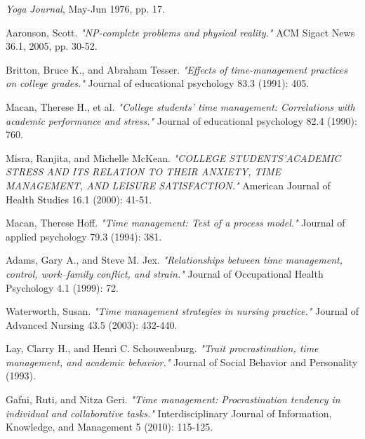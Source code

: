 \documentclass[conference]{IEEEtran}
\begin{document}
\begin{thebibliography}{1}

\emph{Yoga Journal}, \relax May-Jun 1976, pp. 17.

Aaronson, Scott. \emph{"NP-complete problems and physical reality."} ACM Sigact News 36.1, 2005, pp. 30-52.

Britton, Bruce K., and Abraham Tesser. \emph{"Effects of time-management practices on college grades."} Journal of educational psychology 83.3 (1991): 405.

Macan, Therese H., et al. \emph{"College students' time management: Correlations with academic performance and stress."} Journal of educational psychology 82.4 (1990): 760.

Misra, Ranjita, and Michelle McKean. \emph{"COLLEGE STUDENTS'ACADEMIC STRESS AND ITS RELATION TO THEIR ANXIETY, TIME MANAGEMENT, AND LEISURE SATISFACTION."} American Journal of Health Studies 16.1 (2000): 41-51.

Macan, Therese Hoff. \emph{"Time management: Test of a process model."} Journal of applied psychology 79.3 (1994): 381.

Adams, Gary A., and Steve M. Jex. \emph{"Relationships between time management, control, work–family conflict, and strain."} Journal of Occupational Health Psychology 4.1 (1999): 72.

Waterworth, Susan. \emph{"Time management strategies in nursing practice."} Journal of Advanced Nursing 43.5 (2003): 432-440.

Lay, Clarry H., and Henri C. Schouwenburg. \emph{"Trait procrastination, time management, and academic behavior."} Journal of Social Behavior and Personality (1993).

Gafni, Ruti, and Nitza Geri. \emph{"Time management: Procrastination tendency in individual and collaborative tasks."} Interdisciplinary Journal of Information, Knowledge, and Management 5 (2010): 115-125.



\end{thebibliography}




\end{document}
